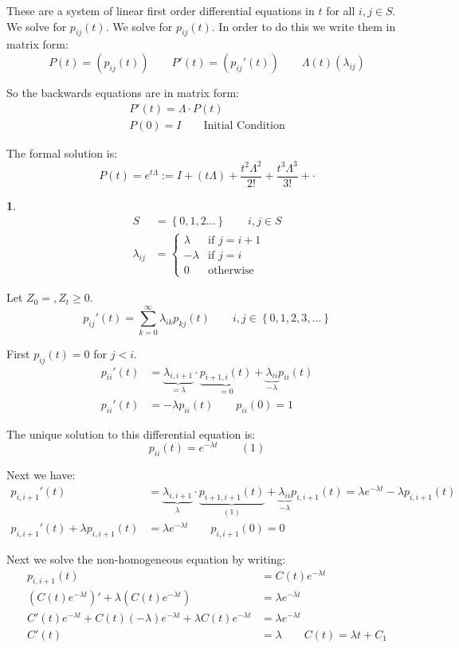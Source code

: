 \documentclass[english,12pt]{article}
\theoremstyle{plain}
\theoremstyle{definition}
\newtheorem*{example}{\protect\examplename}
\theoremstyle{definition} %
\newcommand{\eg}[1]{\begin{example} #1 \end{example} }
\providecommand{\examplename}{Example}
\newcommand{\brac}[1]{\left(#1\right)} %
\newcommand{\curlybrac}[1]{\left\{#1\right\}} %
\begin{document}
These are a system of linear first order differential equations in $t$ for all $i,j\in S$.  We solve for $p_{ij}(t)$.  We solve for $p_{ij}(t)$.  In order to do this we write them in matrix form:
\[P(t)=(p_{ij}(t))\qquad P'(t)=(p_{ij}'(t))\qquad \Lambda(t)(\lambda_{ij})\]

So the backwards equations are in matrix form:
\begin{align*}
P'(t)=\Lambda \cdot P(t)\\
P(0)=I\qquad \text{Initial Condition}
\end{align*}

The formal solution is:
\[P(t)=e^{t\Lambda}:=I+(t\Lambda)+\frac{t^2\Lambda^2}{2!}+\frac{t^3\Lambda^3}{3!}+\cdot\]

\eg{
\begin{align*}
S&=\curlybrac{0,1,2\ldots}\qquad i,j\in S\\
\lambda_{ij}&=\begin{cases}\lambda & \text{if }j=i+1\\
-\lambda & \text{if }j=i\\
0 & \text{otherwise}\end{cases}
\end{align*}

Let $Z_0=, Z_t\ge 0$.
\[p_{ij}'(t)=\sum_{k=0}^\infty \lambda_{ik}p_{kj}(t)\qquad i,j\in\curlybrac{0,1,2,3,\ldots}\]

First $p_{ij}(t)=0$ for $j<i$.
\begin{align*}
p_{ii}'(t)&=\underbrace{\lambda_{i,i+1}}_{=\lambda}\cdot \underbrace{p_{i+1,i}(t)}_{=0}+\underbrace{\lambda_{ii}}_{-\lambda}p_{ii}(t)\\
p_{ii}'(t)&=-\lambda p_{ii}(t)\qquad p_{ii}(0)=1
\end{align*}

The unique solution to this differential equation is:
\[p_{ii}(t)=e^{-\lambda t}\qquad (1)\]

Next we have:
\begin{align*}
p_{i,i+1}'(t)&=\underbrace{\lambda_{i,i+1}}_{\lambda}\cdot \underbrace{p_{i+1,i+1}(t)}_{(1)}+\underbrace{\lambda_{ii}}_{-\lambda}p_{i,i+1}(t)
=\lambda e^{-\lambda t}-\lambda p_{i,i+1}(t)\\
p_{i,i+1}'(t)+\lambda p_{i,i+1}(t)&=\lambda e^{-\lambda t}\qquad p_{i,i+1}(0)=0
\end{align*}

Next we solve the non-homogeneous equation by writing:
\begin{align*}
p_{i,i+1}(t)&=C(t)e^{-\lambda t}\\
\brac{C(t)e^{-\lambda t}}'+\lambda\brac{C(t)e^{-\lambda t}}&=\lambda e^{-\lambda t}\\
C'(t)e^{-\lambda t}+C(t)(-\lambda)e^{-\lambda t}+\lambda C(t)e^{-\lambda t}&=\lambda e^{-\lambda t}\\
C'(t)&=\lambda \qquad C(t)=\lambda t+C_1
\end{align*}

}
\end{document}
